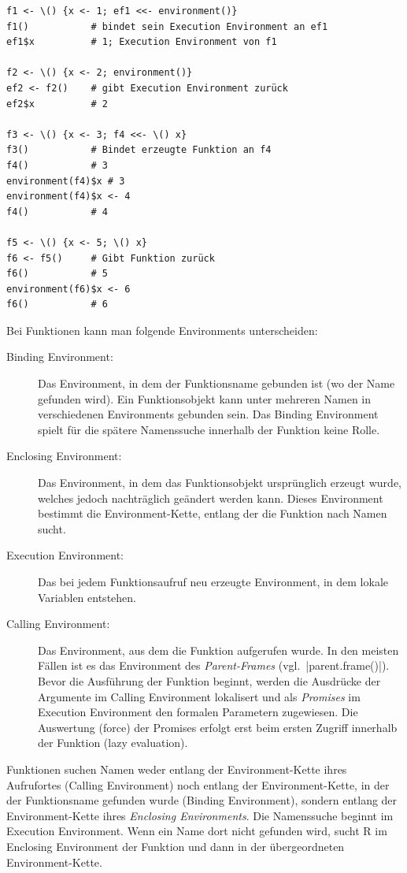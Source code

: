 \documentclass[10pt,twocolumn]{scrartcl}
\renewcommand{\lstinline}{\mycoloredinline}
\begin{document}
\begin{lstlisting}
f1 <- \() {x <- 1; ef1 <<- environment()}
f1()           # bindet sein Execution Environment an ef1
ef1$x          # 1; Execution Environment von f1

f2 <- \() {x <- 2; environment()}
ef2 <- f2()    # gibt Execution Environment zurück
ef2$x          # 2

f3 <- \() {x <- 3; f4 <<- \() x}
f3()           # Bindet erzeugte Funktion an f4
f4()           # 3
environment(f4)$x # 3
environment(f4)$x <- 4
f4()           # 4

f5 <- \() {x <- 5; \() x}
f6 <- f5()     # Gibt Funktion zurück
f6()           # 5
environment(f6)$x <- 6
f6()           # 6
\end{lstlisting}

Bei Funktionen kann man folgende Environments unterscheiden:

\begin{description}
  \item[Binding Environment:] Das Environment, in dem der Funktionsname gebunden ist (wo der Name gefunden wird). Ein Funktionsobjekt kann unter mehreren Namen in verschiedenen Environments gebunden sein. Das Binding Environment spielt für die spätere Namenssuche innerhalb der Funktion keine Rolle.
  \item[Enclosing Environment:] Das Environment, in dem das Funktionsobjekt ursprünglich erzeugt wurde, welches jedoch nachträglich geändert werden kann. Dieses Environment bestimmt die Environment-Kette, entlang der die Funktion nach Namen sucht. 
  \item[Execution Environment:] Das bei jedem Funktionsaufruf neu erzeugte Environment, in dem lokale Variablen entstehen.
  \item[Calling Environment:] Das Environment, aus dem die Funktion aufgerufen wurde. In den meisten Fällen ist es das Environment des \emph{Parent-Frames} (vgl.\ \lstinline|parent.frame()|). Bevor die Ausführung der Funktion beginnt, werden die Ausdrücke der Argumente im Calling Environment lokalisert und als \emph{Promises} im Execution Environment den formalen Parametern zugewiesen. Die Auswertung (force) der Promises erfolgt erst beim ersten Zugriff innerhalb der Funktion (lazy evaluation).
\end{description}

Funktionen suchen Namen weder entlang der Environment-Kette ihres Aufrufortes (Calling Environment) noch entlang der Environment-Kette, in der der Funktionsname gefunden wurde (Binding Environment), sondern entlang der Environment-Kette ihres \emph{Enclosing Environments}.
Die Namenssuche beginnt im Execution Environment. Wenn ein Name dort nicht gefunden wird, sucht R im Enclosing Environment der Funktion und dann in der übergeordneten Environment-Kette.
\end{document}
